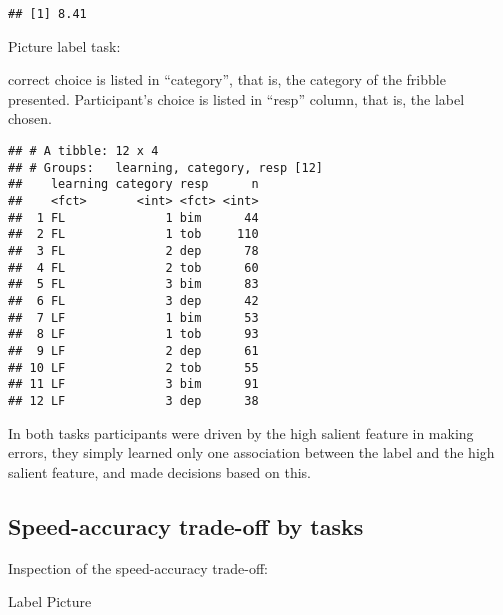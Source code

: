 \documentclass[
]{article}
\newenvironment{Shaded}{\begin{snugshade}}{\end{snugshade}}
\newcommand{\KeywordTok}[1]{\textcolor[rgb]{0.13,0.29,0.53}{\textbf{#1}}}
\newcommand{\NormalTok}[1]{#1}
\newcommand{\OperatorTok}[1]{\textcolor[rgb]{0.81,0.36,0.00}{\textbf{#1}}}
\newcommand{\StringTok}[1]{\textcolor[rgb]{0.31,0.60,0.02}{#1}}
\begin{document}
\begin{verbatim}
## [1] 8.41
\end{verbatim}

Picture label task:

correct choice is listed in ``category'', that is, the category of the
fribble presented. Participant's choice is listed in ``resp'' column,
that is, the label chosen.

\begin{Shaded}
\end{Shaded}

\begin{verbatim}
## # A tibble: 12 x 4
## # Groups:   learning, category, resp [12]
##    learning category resp      n
##    <fct>       <int> <fct> <int>
##  1 FL              1 bim      44
##  2 FL              1 tob     110
##  3 FL              2 dep      78
##  4 FL              2 tob      60
##  5 FL              3 bim      83
##  6 FL              3 dep      42
##  7 LF              1 bim      53
##  8 LF              1 tob      93
##  9 LF              2 dep      61
## 10 LF              2 tob      55
## 11 LF              3 bim      91
## 12 LF              3 dep      38
\end{verbatim}

In both tasks participants were driven by the high salient feature in
making errors, they simply learned only one association between the
label and the high salient feature, and made decisions based on this.

\hypertarget{speed-accuracy-trade-off-by-tasks}{%
\subsection{Speed-accuracy trade-off by
tasks}\label{speed-accuracy-trade-off-by-tasks}}

Inspection of the speed-accuracy trade-off:

Label Picture
\end{document}
